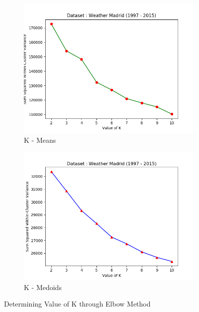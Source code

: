 \documentclass[12pt]{article}
\begin{document}
\begin{figure}[H]
	\centering
	\begin{subfigure}{0.5\linewidth}
		\includegraphics[scale=0.55]{Elbow_Weather.png}
		\caption{K - Means}
		\label{fig:elbow_weather}
	\end{subfigure}%
	\begin{subfigure}{0.5\linewidth}
		\includegraphics[scale=0.55]{k_medoids_elbow_weather.png}
		\caption{K - Medoids}
		\label{fig:elbow_w_medoid}
	\end{subfigure}
	\caption{Determining Value of K through Elbow Method}
\end{figure}
\end{document}
